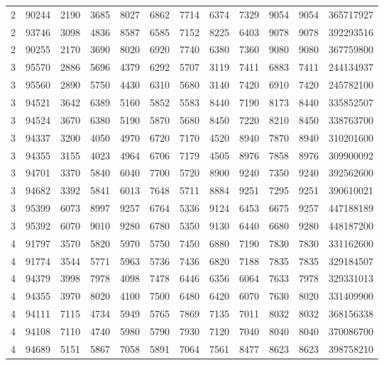 \documentclass[journal]{IEEEtran}
\begin{document}
\begin{table}
\begin{tabular}{|cc|cccccccc|cc|}
2	&	90244	&	2190	&	3685	&	8027	&	6862	&	7714	&	6374	&	7329	&	9054	&	9054	&	365717927	\\
2	&	93746	&	3098	&	4836	&	8587	&	6585	&	7152	&	8225	&	6403	&	9078	&	9078	&	392293516	\\
2	&	90255	&	2170	&	3690	&	8020	&	6920	&	7740	&	6380	&	7360	&	9080	&	9080	&	367759800	\\
\hline																							
3	&	95570	&	2886	&	5696	&	4379	&	6292	&	5707	&	3119	&	7411	&	6883	&	7411	&	244134937	\\
3	&	95560	&	2890	&	5750	&	4430	&	6310	&	5680	&	3140	&	7420	&	6910	&	7420	&	245782100	\\
3	&	94521	&	3642	&	6389	&	5160	&	5852	&	5583	&	8440	&	7190	&	8173	&	8440	&	335852507	\\
3	&	94524	&	3670	&	6380	&	5190	&	5870	&	5680	&	8450	&	7220	&	8210	&	8450	&	338763700	\\
3	&	94337	&	3200	&	4050	&	4970	&	6720	&	7170	&	4520	&	8940	&	7870	&	8940	&	310201600	\\
3	&	94355	&	3155	&	4023	&	4964	&	6706	&	7179	&	4505	&	8976	&	7858	&	8976	&	309900092	\\
3	&	94701	&	3370	&	5840	&	6040	&	7700	&	5720	&	8900	&	9240	&	7350	&	9240	&	392562600	\\
3	&	94682	&	3392	&	5841	&	6013	&	7648	&	5711	&	8884	&	9251	&	7295	&	9251	&	390610021	\\
3	&	95399	&	6073	&	8997	&	9257	&	6764	&	5336	&	9124	&	6453	&	6675	&	9257	&	447188189	\\
3	&	95392	&	6070	&	9010	&	9280	&	6780	&	5350	&	9130	&	6440	&	6680	&	9280	&	448187200	\\
\hline																							
4	&	91797	&	3570	&	5820	&	5970	&	5750	&	7450	&	6880	&	7190	&	7830	&	7830	&	331162600	\\
4	&	91774	&	3544	&	5771	&	5963	&	5736	&	7436	&	6820	&	7188	&	7835	&	7835	&	329184507	\\
4	&	94379	&	3998	&	7978	&	4098	&	7478	&	6446	&	6356	&	6064	&	7633	&	7978	&	329331013	\\
4	&	94355	&	3970	&	8020	&	4100	&	7500	&	6480	&	6420	&	6070	&	7630	&	8020	&	331409900	\\
4	&	94111	&	7115	&	4734	&	5949	&	5765	&	7869	&	7135	&	7011	&	8032	&	8032	&	368156338	\\
4	&	94108	&	7110	&	4740	&	5980	&	5790	&	7930	&	7120	&	7040	&	8040	&	8040	&	370086700	\\
4	&	94689	&	5151	&	5867	&	7058	&	5891	&	7064	&	7561	&	8477	&	8623	&	8623	&	398758210	\\

\end{tabular}
\end{table}
\end{document}
